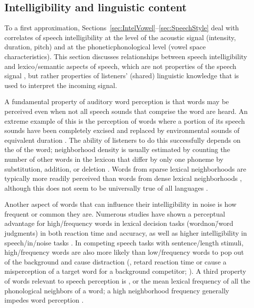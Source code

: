 \subsection{Intelligibility and linguistic content\label{sec:IntelLingContent}}
To a first approximation, Sections~\ref{sec:IntelVowel}–\ref{sec:SpeechStyle} deal with correlates of speech intelligibility at the level of the acoustic signal (intensity, duration, pitch) and at the phonetic\slsh phonological level (vowel space characteristics).  This section discusses relationships between speech intelligibility and lexico\-/semantic aspects of speech, which are not properties of the speech signal \perse, but rather properties of listeners’ (shared) linguistic knowledge that is used to interpret the incoming signal.

A fundamental property of auditory word perception is that words may be perceived even when not all speech sounds that comprise the word are heard.  An extreme example of this is the perception of words where a portion of its speech sounds have been completely excised and replaced by environmental sounds of equivalent duration \citep{Warren1970}.  The ability of listeners to do this successfully depends on the  of the word; neighborhood density is usually estimated by counting the number of other words in the lexicon that differ by only one phoneme by substitution, addition, or deletion \citep{LucePisoni1998}.  Words from sparse lexical neighborhoods are typically more readily perceived than words from dense lexical neighborhoods \citep{VitevitchLuce1998, ZieglerEtAl2003}, although this does not seem to be universally true of all languages \citep{VitevitchRodriguez2005}.%

Another aspect of words that can influence their intelligibility in noise is how frequent or common they are.  Numerous studies have shown a perceptual advantage for high\-/frequency words in lexical decision tasks (word\slsh non\=/word judgments) in both reaction time and accuracy, as well as higher intelligibility in speech\-/in\-/noise tasks \citep[\eg,][]{Howes1957, Savin1963, VitevitchLuce1998, DirksEtAl2001, TakayanagiEtAl2002, VitevitchRodriguez2005}.  In competing speech tasks with sentence\-/length stimuli, high\-/frequency words are also more likely than low\-/frequency words to pop out of the background and cause distraction (\ie, retard reaction time or cause a misperception of a target word for a background competitor; \citealt{BoulengerEtAl2010}).  A third property of words relevant to speech perception is , or the mean lexical frequency of all the phonological neighbors of a word; a high neighborhood frequency generally impedes word perception \citep{LucePisoni1998}.  

